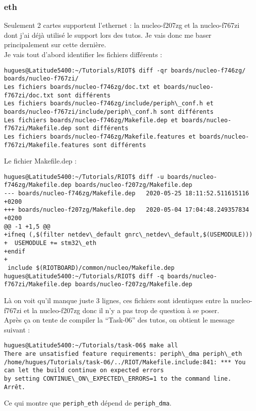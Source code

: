 \subsubsection{eth}
Seulement 2 cartes supportent l'ethernet : la nucleo-f207zg et la
nucleo-f767zi dont j'ai déjà utilisé le support lors des tutos. Je vais
donc me baser principalement sur cette dernière.\\

Je vais tout d’abord identifier les fichiers différents :
{\scriptsize
\begin{verbatim}
hugues@Latitude5400:~/Tutorials/RIOT$ diff -qr boards/nucleo-f746zg/ boards/nucleo-f767zi/
Les fichiers boards/nucleo-f746zg/doc.txt et boards/nucleo-f767zi/doc.txt sont différents
Les fichiers boards/nucleo-f746zg/include/periph\_conf.h et boards/nucleo-f767zi/include/periph\_conf.h sont différents
Les fichiers boards/nucleo-f746zg/Makefile.dep et boards/nucleo-f767zi/Makefile.dep sont différents
Les fichiers boards/nucleo-f746zg/Makefile.features et boards/nucleo-f767zi/Makefile.features sont différents
\end{verbatim}
}
Le fichier Makefile.dep :
{\scriptsize
\begin{verbatim}
hugues@Latitude5400:~/Tutorials/RIOT$ diff -u boards/nucleo-f746zg/Makefile.dep boards/nucleo-f207zg/Makefile.dep 
--- boards/nucleo-f746zg/Makefile.dep	2020-05-25 18:11:52.511615116 +0200
+++ boards/nucleo-f207zg/Makefile.dep	2020-05-04 17:04:48.249357834 +0200
@@ -1 +1,5 @@
+ifneq (,$(filter netdev\_default gnrc\_netdev\_default,$(USEMODULE)))
+  USEMODULE += stm32\_eth
+endif
+
 include $(RIOTBOARD)/common/nucleo/Makefile.dep
hugues@Latitude5400:~/Tutorials/RIOT$ diff -q boards/nucleo-f767zi/Makefile.dep boards/nucleo-f207zg/Makefile.dep 
\end{verbatim}
}
Là on voit qu'il manque juste 3 lignes, ces fichiers sont identiques
entre la nucleo-f767zi et la nucleo-f207zg donc il n'y a pas trop de
question à se poser.\\

Après ça on tente de compiler la \enquote{Task-06} des tutos, on obtient
le message suivant :
{\scriptsize
\begin{verbatim}
hugues@Latitude5400:~/Tutorials/task-06$ make all
There are unsatisfied feature requirements: periph\_dma periph\_eth
/home/hugues/Tutorials/task-06/../RIOT/Makefile.include:841: *** You can let the build continue on expected errors
by setting CONTINUE\_ON\_EXPECTED\_ERRORS=1 to the command line. Arrêt.
\end{verbatim}
}
Ce qui montre que \texttt{periph\_eth} dépend de \texttt{periph\_dma}.\\

